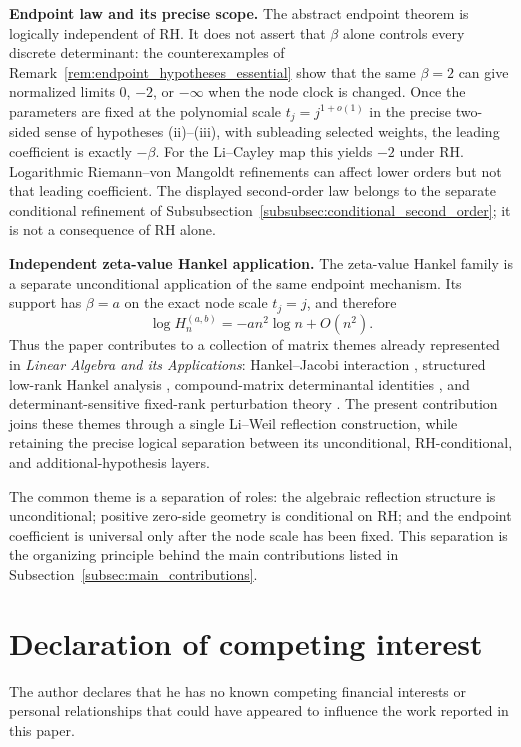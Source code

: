 \documentclass[preprint,12pt]{elsarticle}
\numberwithin{equation}{section}
\theoremstyle{plain}
\theoremstyle{definition}
\theoremstyle{remark}
\newcommand{\RH}{\mathrm{RH}}
\begin{document}
\medskip
\noindent\textbf{Endpoint law and its precise scope.}
The abstract endpoint theorem is logically independent of \(\RH\).  It does not assert that
\(\beta\) alone controls every discrete determinant: the counterexamples of
Remark~\ref{rem:endpoint_hypotheses_essential} show that the same \(\beta=2\) can give normalized
limits \(0\), \(-2\), or \(-\infty\) when the node clock is changed.  Once the parameters are fixed
at the polynomial scale \(t_j=j^{1+o(1)}\) in the precise two-sided sense of hypotheses
\textup{(ii)}--\textup{(iii)}, with subleading selected weights, the leading coefficient is
exactly \(-\beta\).  For the Li--Cayley map this yields \(-2\) under \(\RH\).  Logarithmic
Riemann--von Mangoldt refinements can affect lower orders but not that leading coefficient.
The displayed second-order law belongs to the separate conditional refinement of
Subsubsection~\ref{subsubsec:conditional_second_order}; it is not a consequence of \(\RH\) alone.

\medskip
\noindent\textbf{Independent zeta-value Hankel application.}
The zeta-value Hankel family is a separate unconditional application of the same endpoint
mechanism.  Its support has \(\beta=a\) on the exact node scale \(t_j=j\), and therefore
\[
\log H_n^{(a,b)}=-a n^2\log n+O(n^2).
\]
Thus the paper contributes to a collection of matrix themes already represented in
\emph{Linear Algebra and its Applications}: Hankel--Jacobi interaction
\cite{StampachStovicek2020}, structured low-rank Hankel analysis
\cite{FazziGuglielmiMarkovsky2021}, compound-matrix determinantal identities
\cite{AkianGaubertNiv2018}, and determinant-sensitive fixed-rank perturbation theory
\cite{BaraganaRoca2020}.  The present contribution joins these themes through a single
Li--Weil reflection construction, while retaining the precise logical separation between its
unconditional, \(\RH\)-conditional, and additional-hypothesis layers.

The common theme is a separation of roles: the algebraic reflection structure is unconditional;
positive zero-side geometry is conditional on \(\RH\); and the endpoint coefficient is universal
only after the node scale has been fixed.  This separation is the organizing principle behind the
main contributions listed in Subsection~\ref{subsec:main_contributions}.

\section*{Declaration of competing interest}
The author declares that he has no known competing financial interests or personal relationships
that could have appeared to influence the work reported in this paper.
\end{document}
